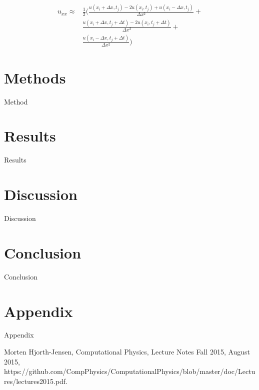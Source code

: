 \documentclass[reprint, english,notitlepage,nofootinbib]{revtex4-1}  %
\begin{document}
\begin{align*}
	u_{xx} \approx &\frac{1}{2} \bigg(\frac{u(x_i+\Delta x, t_j) - 2u(x_i,t_j) + u(x_i-\Delta x, t_j)}{\Delta x^2} + \\
	&\frac{u(x_i+\Delta x, t_j + \Delta t) - 2u(x_i, t_j + \Delta t)}{\Delta x^2} + \\
	&\frac{u(x_i - \Delta x, t_j + \Delta t)}{\Delta x^2} \bigg)
\end{align*}

\section{Methods}

Method

\section{Results}

Results

\section{Discussion}

Discussion

\section{Conclusion}

Conclusion

\section{Appendix}

Appendix

\onecolumngrid
\vspace{1cm} %

\begin{thebibliography}{}
 Morten Hjorth-Jensen, Computational Physics, Lecture Notes Fall 2015, August 2015, https://github.com/CompPhysics/ComputationalPhysics/blob/master/doc/Lectures/lectures2015.pdf.

\end{thebibliography}
\end{document}
